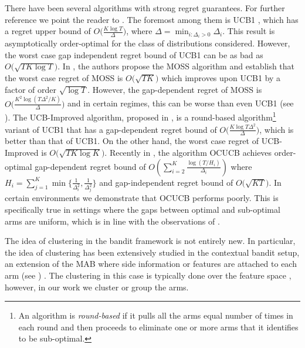	There have been several algorithms with strong regret guarantees. For further reference we point the reader to \cite{bubeck2012bandits}. The foremost among them is UCB1 \cite{auer2002finite}, which has a regret upper bound of $O\big(\frac{K\log T}{\Delta}\big)$, where $\Delta = \min_{i:\Delta_i>0} \Delta_i$. This result is asymptotically order-optimal for the class of distributions considered. However, the worst case gap independent regret bound of UCB1  can be as bad as $O \big(\sqrt{TK\log T}\big)$.  In \cite{audibert2009minimax}, the authors propose the MOSS algorithm and establish that the worst case regret of MOSS is $O\big(\sqrt{TK}\big)$ which improves upon UCB1 by a factor of order $\sqrt{\log T}$. However, the gap-dependent regret of MOSS is  $O\big(\frac{K^{2}\log\left(T\Delta^{2}/K\right)}{\Delta}\big)$ and in certain regimes, this can be worse than even UCB1 (see \cite{audibert2009minimax,lattimore2015optimally}). The UCB-Improved algorithm, proposed in \cite{auer2010ucb}, is a round-based algorithm\footnote{An algorithm is \textit{round-based} if it pulls all the arms equal number of times in each round and then proceeds to eliminate one or more arms that it identifies to be sub-optimal.} variant of UCB1 that 
has a gap-dependent regret bound of $O\big(\frac{K\log T\Delta^{2}}{\Delta}\big)$, which is better than that of UCB1. On the other hand, the worst case regret of UCB-Improved is $O\big(\sqrt{TK\log K}\big)$. Recently in \cite{lattimore2015optimally}, the algorithm OCUCB achieves order-optimal gap-dependent regret bound of $O\left(\sum_{i=2}^{K}\frac{\log\left(T/H_i\right)}{\Delta_i}\right)$ where $H_i=\sum_{j=1}^{K}\min\lbrace \frac{1}{\Delta_i^2},\frac{1}{\Delta_j^2}\rbrace$ and gap-independent regret bound of $O\big( \sqrt{KT}\big)$. 
In certain environments we demonstrate that OCUCB performs poorly. This is specifically true in settings where the gaps between optimal and sub-optimal arms are uniform, which is in line with the observations of \cite{lattimore2015optimally}.

The idea of clustering in the bandit framework is not entirely new. In particular, the idea of clustering has been extensively studied in the contextual bandit setup, an extension of the MAB where side information or features are attached to each arm (see  \cite{auer2002using,langford2008epoch,li2010contextual,beygelzimer2011contextual,slivkins2014contextual}) . The clustering in this case is typically done over the feature space \cite{bui2012clustered,cesa2013gang,gentile2014online}, however, in our work we cluster or group the arms.  

